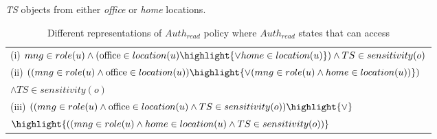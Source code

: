 

 
\begin{table}
	\centering
	\caption{ Different representations of  $Auth_{read}$ policy  where $Auth_{read}$ states that \textit{\manager} can access } \textit{TS} objects  from either \textit{office} or \textit{home} locations. 

	
	\label{tab:LAP-heterogeneity}
	\begin{tabular}{|l|}						
		\hline					
			
			(i) $  \manager \in role(u) \land (\office{} \in location(u) \highlight {\lor home \in location(u)})  \land TS \in sensitivity(o)$ \\
			(ii) $((\manager \in role(u) \land \office{} \in location(u) ) \highlight {\lor (\manager \in role(u) \land home \in location(u) )}  )$ \\ \hfill $ \land TS \in sensitivity(o)$\\
			(iii) $((\manager \in role(u) \land \office{} \in location(u) \land TS \in sensitivity(o) ) \highlight{\lor}$  \\ \hfill $\highlight{((\manager \in role(u) \land home \in location(u) \land TS \in sensitivity(o) )}$ \\
		 \hline	
	\end{tabular}	

	
\end{table}
